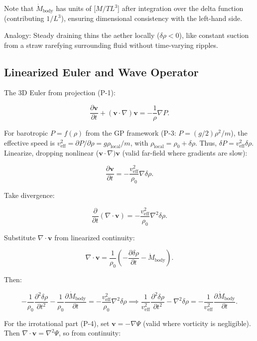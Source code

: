 \documentclass{article}
\begin{document}
Note that $\dot{M}_{\text{body}}$ has units of [$M/T L^3$] after integration over the delta function (contributing $1/L^3$), ensuring dimensional consistency with the left-hand side.

Analogy: Steady draining thins the aether locally ($\delta \rho < 0$), like constant suction from a straw rarefying surrounding fluid without time-varying ripples.

\subsection{Linearized Euler and Wave Operator}

The 3D Euler from projection (P-1):

\[
\frac{\partial \mathbf{v}}{\partial t} + (\mathbf{v} \cdot \nabla) \mathbf{v} = -\frac{1}{\rho} \nabla P.
\]

For barotropic $P = f(\rho)$ from the GP framework (P-3: $P = (g/2) \rho^2 / m$), the effective speed is $v_{\text{eff}}^2 = \partial P / \partial \rho = g \rho_{\text{local}} / m$, with $\rho_{\text{local}} = \rho_0 + \delta \rho$. Thus, $\delta P = v_{\text{eff}}^2 \delta \rho$. Linearize, dropping nonlinear ($\mathbf{v} \cdot \nabla) \mathbf{v}$ (valid far-field where gradients are slow):

\[
\frac{\partial \mathbf{v}}{\partial t} = -\frac{v_{\text{eff}}^2}{\rho_0} \nabla \delta \rho.
\]

Take divergence:

\[
\frac{\partial}{\partial t} (\nabla \cdot \mathbf{v}) = -\frac{v_{\text{eff}}^2}{\rho_0} \nabla^2 \delta \rho.
\]

Substitute $\nabla \cdot \mathbf{v}$ from linearized continuity:

\[
\nabla \cdot \mathbf{v} = \frac{1}{\rho_0} \left( -\frac{\partial \delta \rho}{\partial t} - \dot{M}_{\text{body}} \right).
\]

Then:

\[
-\frac{1}{\rho_0} \frac{\partial^2 \delta \rho}{\partial t^2} - \frac{1}{\rho_0} \frac{\partial \dot{M}_{\text{body}}}{\partial t} = -\frac{v_{\text{eff}}^2}{\rho_0} \nabla^2 \delta \rho \implies \frac{1}{v_{\text{eff}}^2} \frac{\partial^2 \delta \rho}{\partial t^2} - \nabla^2 \delta \rho = -\frac{1}{v_{\text{eff}}^2} \frac{\partial \dot{M}_{\text{body}}}{\partial t}.
\]

For the irrotational part (P-4), set $\mathbf{v} = -\nabla \Psi$ (valid where vorticity is negligible). Then $\nabla \cdot \mathbf{v} = \nabla^2 \Psi$, so from continuity:
\end{document}
